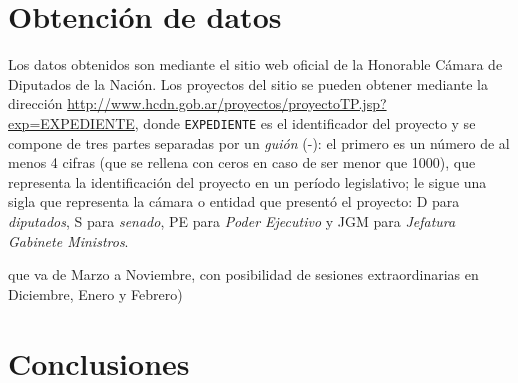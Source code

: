 \documentclass[12pt,a4paper,titlepage]{article}
\begin{document}
  \section{Obtención de datos}\label{section:data}

  Los datos obtenidos son mediante el sitio web oficial de la Honorable Cámara
  de Diputados de la Nación.  Los proyectos del sitio se pueden obtener
  mediante la dirección
  \url{http://www.hcdn.gob.ar/proyectos/proyectoTP.jsp?exp=EXPEDIENTE}, donde
  {\tt EXPEDIENTE} es el identificador del proyecto y se compone de tres partes
  separadas por un {\em guión} (-): el primero es un número de al menos 4
  cifras (que se rellena con ceros en caso de ser menor que 1000), que
  representa la identificación del proyecto en un período legislativo; le sigue
  una sigla que representa la cámara o entidad que presentó el proyecto: D para
  {\em diputados}, S para {\em senado}, PE para {\em Poder Ejecutivo} y JGM
  para {\em Jefatura Gabinete Ministros}.
  
  que va de Marzo a Noviembre, con posibilidad de sesiones extraordinarias en
  Diciembre, Enero y Febrero)

  \section{Conclusiones}\label{section:conclusions}

\end{document}
